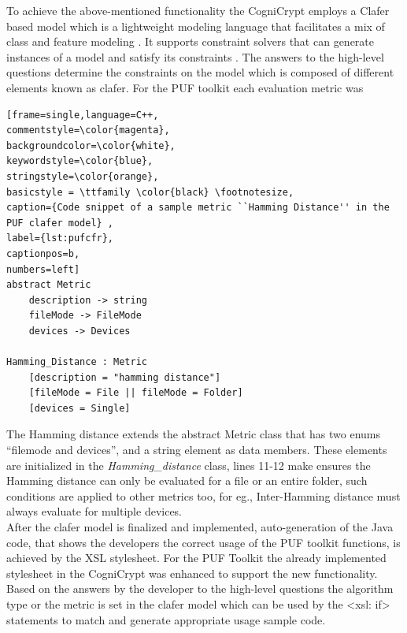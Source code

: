 To achieve the above-mentioned functionality the CogniCrypt employs a Clafer based model which is a lightweight modeling language that facilitates a mix of class and feature modeling \cite{clafer,cogni}. It supports constraint solvers that can generate instances of a model and satisfy its constraints \cite{cogni}. The answers to the high-level questions determine the constraints on the model which is composed of different elements known as clafer. For the PUF toolkit each evaluation metric was

\begin{lstlisting}[frame=single,language=C++,
commentstyle=\color{magenta},
backgroundcolor=\color{white},
keywordstyle=\color{blue},
stringstyle=\color{orange},
basicstyle = \ttfamily \color{black} \footnotesize,
caption={Code snippet of a sample metric ``Hamming Distance'' in the PUF clafer model} ,
label={lst:pufcfr},
captionpos=b,
numbers=left]
abstract Metric
	description -> string
	fileMode -> FileMode
	devices -> Devices

Hamming_Distance : Metric
	[description = "hamming distance"]
	[fileMode = File || fileMode = Folder]
	[devices = Single]
\end{lstlisting}

The Hamming distance extends the abstract Metric class that has two enums ``filemode and devices'', and a string element as data members. These elements are initialized in the \emph{Hamming\_distance} class, lines 11-12 make ensures the Hamming distance can only be evaluated for a file or an entire folder, such conditions are applied to other metrics too, for eg., Inter-Hamming distance must always evaluate for multiple devices.\\ 

After the clafer model is finalized and implemented, auto-generation of the Java code, that shows the developers the correct usage of the PUF toolkit functions, is achieved by the XSL stylesheet. For the PUF Toolkit the already implemented stylesheet in the CogniCrypt was enhanced to support the new functionality. Based on the answers by the developer to the high-level questions the algorithm type or the metric is set in the clafer model which can be used by the <xsl: if> statements
to match and generate appropriate usage sample code. %


